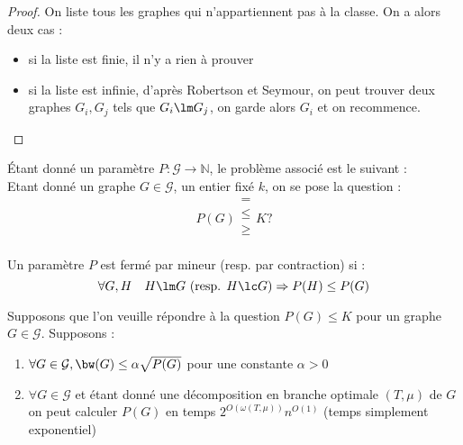 \documentclass[a4paper, 11pt]{thesis}
\begin{document}
\begin{proof}
    On liste tous les graphes qui n'appartiennent pas à la classe. On a alors deux cas :
    \begin{itemize}
        \item si la liste est finie, il n'y a rien à prouver
        \item si la liste est infinie, d'après Robertson et Seymour, on peut trouver deux graphes
            $G_i, G_j$ tels que $G_i \lm G_j$, on garde alors $G_i$ et on recommence.
    \end{itemize}
\end{proof}

\begin{df}
    Étant donné un paramètre $P : \mathcal{G} \longrightarrow \mathbb{N}$, le problème associé est
    le suivant : \\
    Etant donné un graphe $G \in \mathcal{G}$, un entier fixé $k$, on se pose la question :
    \begin{displaymath}
        P(G) \left . \begin{array}{c}
            = \\ \leq \\ \geq \\
        \end{array}
        \right .
        K ?
    \end{displaymath}
\end{df}

\begin{df}
    Un paramètre $P$ est fermé par mineur (resp. par contraction) si :
    \begin{displaymath}
        \forall G, H \quad H \lm G\ (\mbox{resp. } H \lc G) \Rightarrow P(H) \leq P(G)
    \end{displaymath}
\end{df}



Supposons que l'on veuille répondre à la question $P(G) \leq K$ pour un graphe $G \in \mathcal{G}$.
Supposons :
\begin{enumerate}[A]
    \item $\forall G \in \mathcal{G}, \bw(G) \leq \alpha \sqrt{P(G)}$ pour une constante $\alpha >
        0$
    \item $\forall G \in \mathcal{G}$ et étant donné une décomposition en branche optimale $(T,
        \mu)$ de $G$ on peut calculer $P(G)$ en temps $2^{O(\omega(T,\mu))} n^{O(1)}$ (temps
        simplement exponentiel)
\end{enumerate}
\end{document}
